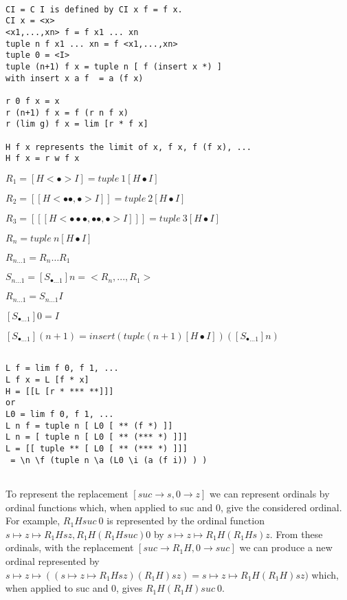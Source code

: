 \documentclass[10pt]{article}
\begin{document}
\begin{verbatim}

CI = C I is defined by CI x f = f x.
CI x = <x>
<x1,...,xn> f = f x1 ... xn
tuple n f x1 ... xn = f <x1,...,xn>
tuple 0 = <I>
tuple (n+1) f x = tuple n [ f (insert x *) ]
with insert x a f  = a (f x)

r 0 f x = x
r (n+1) f x = f (r n f x)
r (lim g) f x = lim [r * f x]

H f x represents the limit of x, f x, f (f x), ...
H f x = r w f x

\end{verbatim}

\( R_1 = [H <\bullet> I] = tuple\ 1 [H \bullet I] \)

\( R_2 = [[H <\bullet\bullet,\bullet> I]] = tuple\ 2 [H \bullet I] \)

\( R_3 = [[[H <\bullet\bullet\bullet,\bullet\bullet,\bullet> I]]] = tuple\ 3 [H \bullet I] \)

\( R_n = tuple\ n [H \bullet I] \)

\( R_{n \ldots 1} = R_n \ldots R_1 \)

\( S_{n...1} = [S_{\bullet...1}] n = <R_n,...,R_1> \)

\( R_{n \ldots 1} = S_{n \ldots 1} I \)

\( [S_{\bullet \ldots 1}] 0 = I \)

\( [S_{\bullet \ldots 1}] (n+1) = insert (tuple (n+1) [H \bullet I]) ([S_{\bullet \ldots 1}] n) \)

\begin{verbatim}

L f = lim f 0, f 1, ...
L f x = L [f * x]
H = [[L [r * *** **]]]
or
L0 = lim f 0, f 1, ...
L n f = tuple n [ L0 [ ** (f *) ]]
L n = [ tuple n [ L0 [ ** (*** *) ]]]
L = [[ tuple ** [ L0 [ ** (*** *) ]]]
 = \n \f (tuple n \a (L0 \i (a (f i)) ) )
 
\end{verbatim}

To represent the replacement \( [suc \rightarrow s,0 \rightarrow z] \) we can represent ordinals by ordinal functions which, when applied to suc and 0, give the considered ordinal. For example, \( R_1 H suc\ 0 \) is represented by the ordinal function \( s \mapsto z \mapsto R_1 H s z, R_1 H (R_1 H suc) 0 \) by \( s \mapsto z \mapsto R_1 H (R_1 H s) z \). From these ordinals, with the replacement \( [suc \rightarrow R_1 H,0 \rightarrow suc] \) we can produce a new ordinal represented by \( s \mapsto z \mapsto ((s \mapsto z \mapsto R_1 H s z) (R_1 H) s z) = s \mapsto z \mapsto R_1 H (R_1 H) s z) \) which, when applied to suc and 0, gives \( R_1 H (R_1 H) suc\ 0 \).
\end{document}
